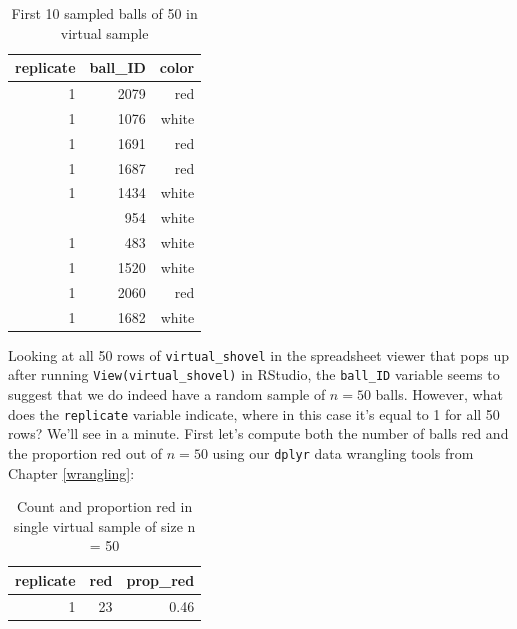 \documentclass[12pt,]{krantz}
\makeatletter
\newenvironment{Shaded}{\begin{snugshade}}{\end{snugshade}}
\newcommand{\KeywordTok}[1]{\textcolor[rgb]{0.27,0.27,0.27}{\textbf{#1}}}
\newcommand{\DataTypeTok}[1]{\textcolor[rgb]{0.27,0.27,0.27}{#1}}
\newcommand{\DecValTok}[1]{\textcolor[rgb]{0.06,0.06,0.06}{#1}}
\newcommand{\StringTok}[1]{\textcolor[rgb]{0.5,0.5,0.5}{#1}}
\newcommand{\OperatorTok}[1]{\textcolor[rgb]{0.43,0.43,0.43}{\textbf{#1}}}
\newcommand{\NormalTok}[1]{#1}
\newenvironment{kframe}{%
\medskip{}
\setlength{\fboxsep}{.8em}
 \def\at@end@of@kframe{}%
 \ifinner\ifhmode%
  \def\at@end@of@kframe{\end{minipage}}%
  \begin{minipage}{\columnwidth}%
 \fi\fi%
 \def\FrameCommand##1{\hskip\@totalleftmargin \hskip-\fboxsep
 \colorbox{shadecolor}{##1}\hskip-\fboxsep
     \hskip-\linewidth \hskip-\@totalleftmargin \hskip\columnwidth}%
 \MakeFramed {\advance\hsize-\width
   \@totalleftmargin\z@ \linewidth\hsize
   \@setminipage}}%
 {\par\unskip\endMakeFramed%
 \at@end@of@kframe}
\renewenvironment{Shaded}{\begin{kframe}}{\end{kframe}}
\theoremstyle{definition}
\theoremstyle{definition}
\theoremstyle{definition}
\theoremstyle{remark}
\makeatother
\begin{document}
\begin{table}[H]

\caption{\label{tab:unnamed-chunk-266}First 10 sampled balls of 50 in virtual sample}
\centering
\fontsize{10}{12}\selectfont
\begin{tabular}[t]{rrr}
\toprule
replicate & ball\_ID & color\\
\midrule
1 & 2079 & red\\
1 & 1076 & white\\
1 & 1691 & red\\
1 & 1687 & red\\
1 & 1434 & white\\
\addlinespace
1 & 954 & white\\
1 & 483 & white\\
1 & 1520 & white\\
1 & 2060 & red\\
1 & 1682 & white\\
\bottomrule
\end{tabular}
\end{table}

Looking at all 50 rows of \texttt{virtual\_shovel} in the spreadsheet
viewer that pops up after running \texttt{View(virtual\_shovel)} in
RStudio, the \texttt{ball\_ID} variable seems to suggest that we do
indeed have a random sample of \(n=50\) balls. However, what does the
\texttt{replicate} variable indicate, where in this case it's equal to 1
for all 50 rows? We'll see in a minute. First let's compute both the
number of balls red and the proportion red out of \(n=50\) using our
\texttt{dplyr} data wrangling tools from Chapter \ref{wrangling}:

\begin{Shaded}
\end{Shaded}

\begin{table}[H]

\caption{\label{tab:unnamed-chunk-268}Count and proportion red in single virtual sample of size n = 50}
\centering
\fontsize{10}{12}\selectfont
\begin{tabular}[t]{rrr}
\toprule
replicate & red & prop\_red\\
\midrule
1 & 23 & 0.46\\
\bottomrule
\end{tabular}
\end{table}
\end{document}
